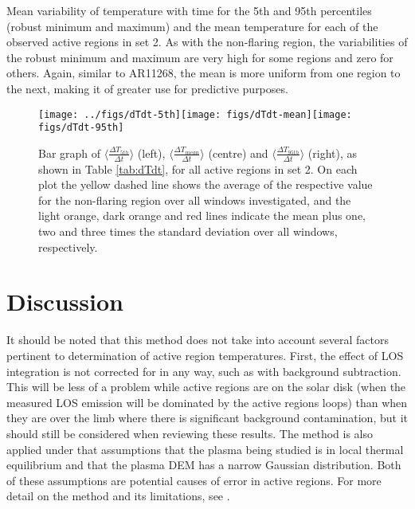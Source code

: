\documentclass[namedreferences]{solarphysics}
\begin{document}
\begin{article}
\begin{table}
\caption{Mean variability of temperature with time for the 5th and 95th percentiles (robust minimum and maximum) and the mean temperature for each of the observed active regions in set 2.
As with the non-flaring region, the variabilities of the robust minimum and maximum are very high for some regions and zero for others.
Again, similar to AR11268, the mean is more uniform from one region to the next, making it of greater use for predictive purposes.\label{tab:dTdt}}
\end{table}

\begin{figure}
\begin{centering}
\texttt{[image: ../figs/dTdt-5th]}\texttt{[image: figs/dTdt-mean]}\texttt{[image: figs/dTdt-95th]}
\par\end{centering}

\caption{Bar graph of $\langle\frac{\Delta T_{5th}}{\Delta t}\rangle$ (left), $\langle\frac{\Delta T_{mean}}{\Delta t}\rangle$ (centre) and $\langle\frac{\Delta T_{95th}}{\Delta t}\rangle$ (right), as shown in Table \ref{tab:dTdt}, for all active regions in set 2.
On each plot the yellow dashed line shows the average of the respective value for the non-flaring region over all windows investigated, and the light orange, dark orange and red lines indicate the mean plus one, two and three times the standard deviation over all windows, respectively.\label{fig:Bar-graph-flaring}}
\end{figure}

\section{Discussion}

It should be noted that this method does not take into account several factors pertinent to determination of active region temperatures.
First, the effect of LOS integration is not corrected for in any way, such as with background subtraction.
This will be less of a problem while active regions are on the solar disk (when the measured LOS emission will be dominated by the active regions loops) than when they are over the limb where there is significant background contamination, but it should still be considered when reviewing these results.
The method is also applied under that assumptions that the plasma being studied is in local thermal equilibrium and that the plasma DEM has a narrow Gaussian distribution.
Both of these assumptions are potential causes of error in active regions.
For more detail on the method and its limitations, see \cite{Leonard}.


\end{article}
\end{document}
